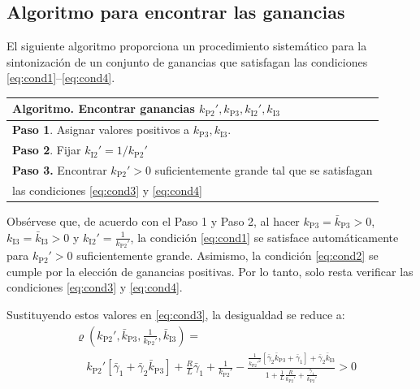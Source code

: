 \subsection*{Algoritmo para encontrar las ganancias}\label{sec:algoritmo}

El siguiente algoritmo proporciona un procedimiento sistemático para la 
sintonización de un conjunto de ganancias que satisfagan las condiciones 
\eqref{eq:cond1}--\eqref{eq:cond4}.

\begin{tabular}{l}
\hline
\textbf{Algoritmo.} Encontrar ganancias $k_{\textrm{P2}}',k_{\textrm{P3}},k_{\textrm{I2}}',k_{\textrm{I3}}$\\
\hline
\textbf{Paso 1}. Asignar valores positivos a $k_{\textrm{P3}},k_{\textrm{I3}}$.\\
\textbf{Paso 2}. Fijar $k_{\textrm{I2}}' = 1/k_{\textrm{P2}}'$\\
\textbf{Paso 3.} Encontrar $k_{\textrm{P2}}' > 0$ suficientemente grande tal que se satisfagan \\
\quad\quad\quad\quad las condiciones \eqref{eq:cond3} y \eqref{eq:cond4}\\\hline
\end{tabular}
\vspace{1em}

Obsérvese que, de acuerdo con el Paso 1 y Paso 2, al hacer $k_{\textrm{P3}} = \bar{k}_{\textrm{P3}} > 0$, $k_{\textrm{I3}} = \bar{k}_{\textrm{I3}} > 0$ y $k_{\textrm{I2}}' = \frac{1}{k_{\textrm{P2}}'}$, la condición \eqref{eq:cond1} se satisface automáticamente para $k_{\textrm{P2}}' > 0$ suficientemente grande. Asimismo, la condición \eqref{eq:cond2} se cumple por la elección de ganancias positivas. Por lo tanto, solo resta verificar las condiciones \eqref{eq:cond3} y \eqref{eq:cond4}.

Sustituyendo estos valores en \eqref{eq:cond3}, la desigualdad se reduce a:
\begin{align*}
&\varrho\left(k_{\textrm{P2}}',\bar{k}_{\textrm{P3}},\frac{1}{k_{\textrm{P2}}'},\bar{k}_{\textrm{I3}}\right) = \\
&\quad k_{\textrm{P2}}'\left[\bar{\gamma}_1 + \bar{\gamma}_2 \bar{k}_{\textrm{P3}}\right] + \frac{R}{L}\bar{\gamma}_1  + \frac{1}{k_{\textrm{P2}}'} - \frac{\frac{1}{k_{\textrm{P2}}'^2}\left[\bar{\gamma}_2\bar{k}_{\textrm{P3}} + \bar{\gamma}_1\right] + \bar{\gamma}_2 \bar{k}_{\textrm{I3}}}{1 + \frac{1}{L}\frac{R}{k_{\textrm{P2}}'} + \frac{\bar{\gamma}_1}{k_{\textrm{P2}}'}} > 0
\end{align*}

